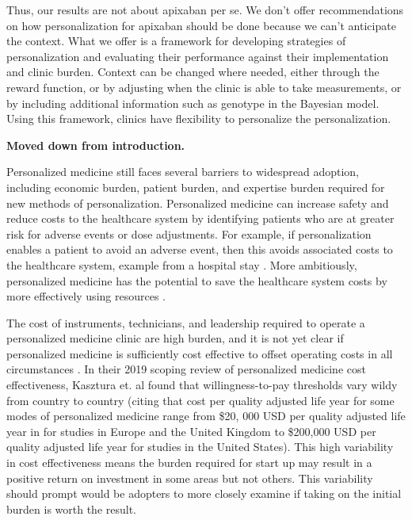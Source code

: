 Thus, our results are not about apixaban per se.  We don’t offer recommendations on how personalization for apixaban should be done because we can’t anticipate the context.  What we offer is a framework for developing strategies of personalization and evaluating their performance against their implementation and clinic burden.  Context can be changed where needed, either through the reward function, or by adjusting when the clinic is able to take measurements, or by including additional information such as genotype in the Bayesian model.  Using this framework, clinics have flexibility to personalize the personalization.

\textbf{Moved down from introduction.}

Personalized medicine still faces several barriers to widespread adoption, including economic burden, patient burden, and expertise burden required for new methods of personalization.
Personalized medicine can increase safety and reduce costs to the healthcare system by identifying patients who are at greater risk for adverse events or dose adjustments.  For example, if personalization enables a patient to avoid an adverse event, then this avoids associated costs to the healthcare system, example from a hospital stay \cite{looff2016economic}.  More ambitiously, personalized medicine has the potential to save the healthcare system costs by more effectively using resources \cite{shabaruddin2015economic}. 

The cost of instruments, technicians, and leadership required to operate a personalized medicine clinic are high burden, and it is not yet clear if personalized medicine is sufficiently cost effective to offset operating costs in all circumstances \cite{kasztura2019cost}.  In their 2019 scoping review of personalized medicine cost effectiveness, Kasztura et. al \cite{kasztura2019cost} found that willingness-to-pay thresholds vary wildy from country to country (citing that cost per quality adjusted life year for some modes of personalized medicine range from \$20, 000 USD per quality adjusted life year in for studies in Europe and the United Kingdom to \$200,000 USD per quality adjusted life year for studies in the United States).  This high variability in cost effectiveness means the burden required for start up may result in a positive return on investment in some areas but not others. This variability should prompt would be adopters to more closely examine if taking on the initial burden is worth the result.


